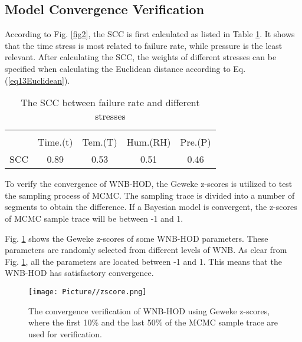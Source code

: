 \documentclass[journal,twoside,web]{ieeecolor}
\begin{document}
\subsection{Model Convergence Verification}
According to Fig. \ref{fig2},  the SCC is first calculated as listed in Table \ref{tabSCC}. It shows that the time stress is most related to failure rate, while pressure is the least relevant. After calculating the SCC, the weights of different stresses can be specified when calculating the Euclidean distance according to Eq. (\ref{eq13Euclidean}).
\begin{table}
	\caption{The SCC between failure rate and different stresses}
	\label{tabSCC}
	\setlength{\tabcolsep}{7pt}
	\renewcommand\arraystretch{1.1}
	\begin{center}
		\begin{tabular}{c c c c c}	
			\hline\hline \\[-3mm]
			\multicolumn{1}{c}{} &  \multicolumn{1}{c}{Time.(t)} &  \multicolumn{1}{c}{Tem.(T)} &  \multicolumn{1}{c}{Hum.(RH)}  &  \multicolumn{1}{c}{Pre.(P)} \\ 
			\hline
			SCC    & 0.89      & 0.53       & 0.51             & 0.46      \\
			\hline\hline
		\end{tabular}
	\end{center}
\end{table}

To verify the convergence of WNB-HOD, the Geweke z-scores is utilized to test the sampling process of MCMC. The sampling trace is divided into a number of segments to obtain the difference. If a Bayesian model is convergent, the z-scores of MCMC sample trace will be between -1 and 1.

Fig. \ref{fig3Geweke} shows the Geweke z-scores of some WNB-HOD parameters. These parameters are randomly selected from different levels of WNB. As clear from Fig. \ref{fig3Geweke}, all the parameters are located between -1 and 1. This means that the WNB-HOD has satisfactory convergence.
\begin{figure}
	\centerline{\texttt{[image: Picture//zscore.png]}}
	\caption{The convergence verification of WNB-HOD using Geweke z-scores, where the first 10\% and the last 50\% of the MCMC sample trace are used for verification.}
	\label{fig3Geweke}
\end{figure}
\end{document}
